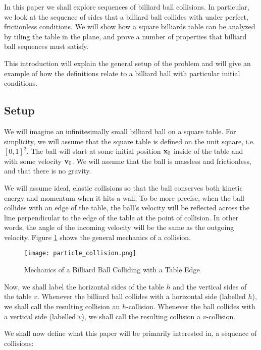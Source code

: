 In this paper we shall explore sequences of billiard ball collisions. In particular, we look at the sequence of sides that a billiard ball collides with under perfect, frictionless conditions. We will show how a square billiards table can be analyzed by tiling the table in the plane, and prove a number of properties that billiard ball sequences must satisfy.

This introduction will explain the general setup of the problem and will give an example of how the definitions relate to a billiard ball with particular initial conditions.

\subsection{Setup}

We will imagine an infinitesimally small billiard ball on a square table. For simplicity, we will assume that the square table is defined on the unit square, i.e. $[0,1]^2$. The ball will start at some initial position $\mathbf{x}_0$ inside of the table and with some velocity $\mathbf{v}_0$. We will assume that the ball is massless and frictionless, and that there is no gravity.

We will assume ideal, elastic collisions so that the ball conserves both kinetic energy and momentum when it hits a wall. To be more precise, when the ball collides with an edge of the table, the ball's velocity will be reflected across the line perpendicular to the edge of the table at the point of collision. In other words, the angle of the incoming velocity will be the same as the outgoing velocity. Figure \ref{fig:collision-angle} shows the general mechanics of a collision.

\begin{figure}
  \texttt{[image: particle\_collision.png]}
  \caption{\label{fig:collision-angle}Mechanics of a Billiard Ball Colliding with a Table Edge}
\end{figure}

Now, we shall label the horizontal sides of the table $h$ and the vertical sides of the table $v$. Whenever the billiard ball collides with a horizontal side (labelled $h$), we shall call the resulting collision an $h$-collision. Whenever the ball collides with a vertical side (labelled $v$), we shall call the resulting collision a $v$-collision.

We shall now define what this paper will be primarily interested in, a sequence of collisions:

